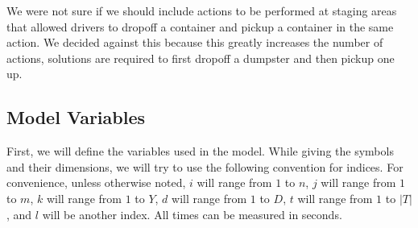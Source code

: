 \documentclass{article}
\begin{document}
We were not sure if we should include actions to be performed at staging areas that allowed drivers to dropoff a container and pickup a container in the same action.
We decided against this because this greatly increases the number of actions, solutions are required to first dropoff a dumpster and then pickup one up.

\subsection{Model Variables}

First, we will define the variables used in the model.
While giving the symbols and their dimensions, we will try to use the following convention for indices.
For convenience, unless otherwise noted, 
$i$ will range from $1$ to $n$,
$j$ will range from $1$ to $m$,
$k$ will range from $1$ to $Y$,
$d$ will range from $1$ to $D$,
$t$ will range from $1$ to $|T|$,
and $l$ will be another index.
All times can be measured in seconds.
\end{document}
